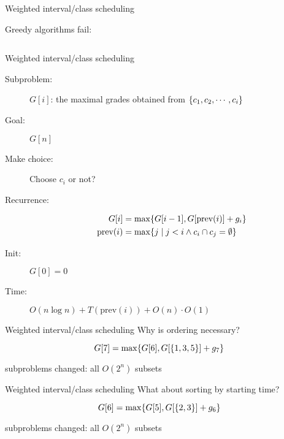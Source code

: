 \begin{frame}{Weighted interval/class scheduling}
  \centerline{Greedy algorithms fail:}
  
  \vspace{0.30cm}
  \begin{columns}
	  \pause
  \end{columns}
\end{frame}
\begin{frame}{Weighted interval/class scheduling}
  \begin{description}
	\item[Subproblem:] $G[i]$: the maximal grades obtained from $\{c_{1}, c_{2}, \cdots, c_{i}\}$
	\item[Goal:] $G[n]$
	  \pause
	\item[Make choice:] Choose $c_{i}$ or not?  
	\item[Recurrence:] 
	  \begin{align*}
		G[i] &= \max \{G[i-1], G[\text{prev}(i)] + g_{i}\}  \\
		\text{prev}(i) &= \max\{j \mid j < i \land c_{i} \cap c_{j} = \emptyset\}
	  \end{align*}
	  \pause
	\item[Init:] $G[0] = 0$
	\item[Time:] $O(n \log n) + T(\text{prev}(i)) + O(n) \cdot O(1)$
  \end{description}
\end{frame}
\begin{frame}{Weighted interval/class scheduling}
  Why is ordering necessary?

  \[
	G[7] = \max \{G[6], G[\{1,3,5\}] + g_{7}\}
  \]

  \begin{center}
	subproblems changed: all $O(2^{n})$ subsets
  \end{center}
\end{frame}
\begin{frame}{Weighted interval/class scheduling}
  What about sorting by starting time?

  \[
	G[6] = \max \{G[5], G[\{2,3\}] + g_{6}\}
  \]

  \begin{center}
	subproblems changed: all $O(2^{n})$ subsets
  \end{center}
\end{frame}
